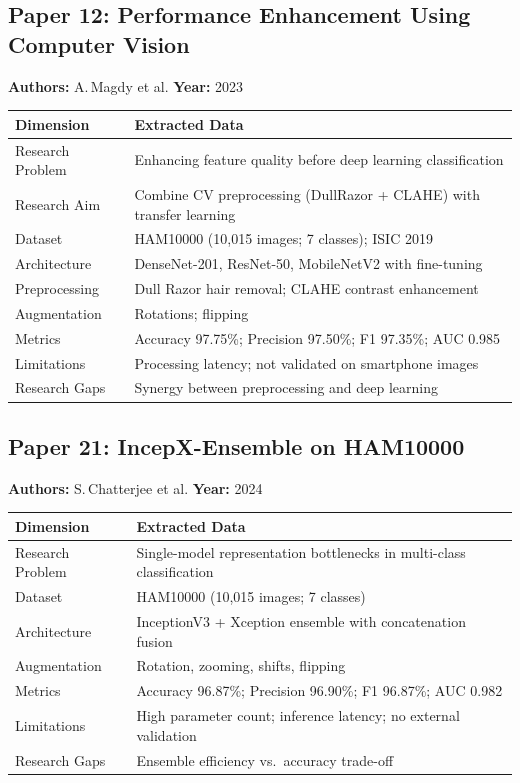 \documentclass[11pt,a4paper]{article}
\begin{document}
\subsection{Paper 12: Performance Enhancement Using Computer Vision}
\textbf{Authors:} A.\,Magdy et al. \hfill \textbf{Year:} 2023

\begin{tabularx}{\textwidth}{@{}L{4.2cm}X@{}}
\toprule
\textbf{Dimension} & \textbf{Extracted Data} \\
\midrule
Research Problem & Enhancing feature quality before deep learning classification \\
Research Aim & Combine CV preprocessing (DullRazor + CLAHE) with transfer learning \\
Dataset & HAM10000 (10,015 images; 7 classes); ISIC 2019 \\
Architecture & DenseNet-201, ResNet-50, MobileNetV2 with fine-tuning \\
Preprocessing & Dull Razor hair removal; CLAHE contrast enhancement \\
Augmentation & Rotations; flipping \\
Metrics & Accuracy 97.75\%; Precision 97.50\%; F1 97.35\%; AUC 0.985 \\
Limitations & Processing latency; not validated on smartphone images \\
Research Gaps & Synergy between preprocessing and deep learning \\
\bottomrule
\end{tabularx}

\subsection{Paper 21: IncepX-Ensemble on HAM10000}
\textbf{Authors:} S.\,Chatterjee et al. \hfill \textbf{Year:} 2024

\begin{tabularx}{\textwidth}{@{}L{4.2cm}X@{}}
\toprule
\textbf{Dimension} & \textbf{Extracted Data} \\
\midrule
Research Problem & Single-model representation bottlenecks in multi-class classification \\
Dataset & HAM10000 (10,015 images; 7 classes) \\
Architecture & InceptionV3 + Xception ensemble with concatenation fusion \\
Augmentation & Rotation, zooming, shifts, flipping \\
Metrics & Accuracy 96.87\%; Precision 96.90\%; F1 96.87\%; AUC 0.982 \\
Limitations & High parameter count; inference latency; no external validation \\
Research Gaps & Ensemble efficiency vs.\ accuracy trade-off \\
\bottomrule
\end{tabularx}
\end{document}
